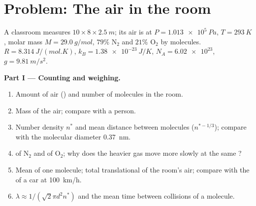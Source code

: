 \section{Problem: The air in the room}

\begin{problem}
\label{pb:b1:kinetic-theory:1}
A classroom measures $10 \times 8 \times \qty{2.5}{m}$; its air is at
$P = \qty{1.013e5}{Pa}$, $T = \qty{293}{K}$, molar mass $M = \qty{29.0}{g/mol}$,
$79\%$ N$_2$ and $21\%$ O$_2$ by molecules. $R = \qty{8.314}{J/(mol.K)}$,
$k_B = \qty{1.38e-23}{J/K}$, $N_A = \num{6.02e23}$, $g = \qty{9.81}{m/s^2}$.

\medskip
\noindent\textbf{Part I --- Counting and weighing.}
\begin{enumerate}
  \item Amount of air () and number of molecules in the room.
  \item Mass of the air; compare with a person.
  \item Number density $n^*$ and mean distance between molecules
        ($n^{*-1/3}$); compare with the molecular diameter \qty{0.37}{nm}.
  \item {} of N$_2$ and of O$_2$; why does the heavier
        gas move more slowly at the same ?
  \item Mean  of one molecule; total translational  of the room's air; compare with the  of a
        car at \qty{100}{km/h}.
  \item {} $\lambda \approx 1/(\sqrt2\pi d^2n^*)$ and the mean
        time between collisions of a molecule.
\end{enumerate}


\end{problem}

